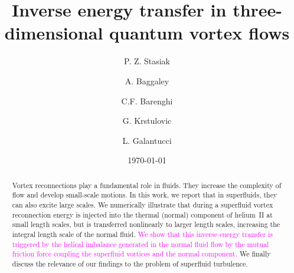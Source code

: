 \documentclass[%
 reprint,
 amsmath,amssymb,
 aps,
 prl,
]{revtex4-2}
\def\magenta#1{\textcolor{magenta}{#1}}
\begin{document}

\title{Inverse energy transfer in three-dimensional quantum vortex flows}

\author{P. Z. Stasiak}
\author{A. Baggaley}
\author{C.F. Barenghi}

\author{G. Krstulovic}

\author{L. Galantucci}

\date{\today}%

\begin{abstract}
Vortex reconnections play a fundamental role in fluids.
They increase the complexity of flow and develop small-scale motions.
In this work, we report that in superfluids, they can also excite large scales.
We numerically illustrate that during a superfluid vortex reconnection energy 
is injected 
into the thermal (normal) component of helium~II at small length scales, but is transferred nonlinearly  to larger length scales, increasing the integral length scale of the normal
fluid.  
\magenta{We show that this inverse energy transfer is triggered by the helical imbalance generated 
in the normal fluid flow by
the mutual friction force coupling the superfluid vortices and the normal component.} We finally discuss
the relevance of our findings to 
the problem of superfluid turbulence.
\end{abstract}

\maketitle
\end{document}
